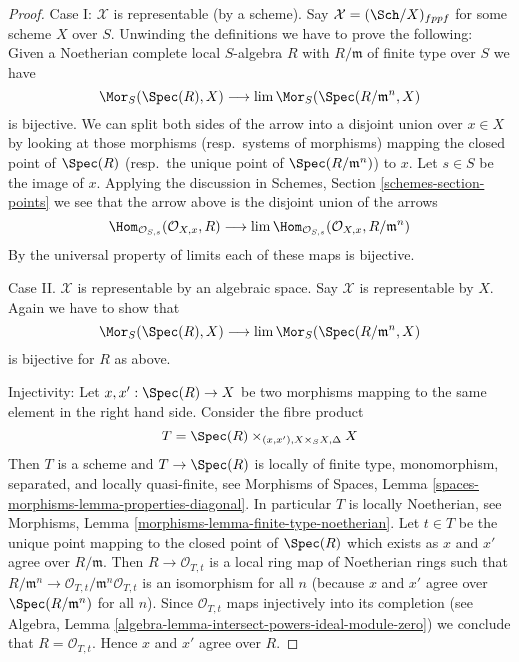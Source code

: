 \begin{proof}
Case I: $\mathcal{X}$ is representable (by a scheme). Say
$\mathcal{X} = (\Sch/X)_{fppf}$ for some scheme $X$ over $S$.
Unwinding the definitions we have to prove the following: Given
a Noetherian complete local $S$-algebra $R$ with $R/\mathfrak m$ of
finite type over $S$ we have
$$
\Mor_S(\Spec(R), X) \longrightarrow \lim \Mor_S(\Spec(R/\mathfrak m^n, X)
$$
is bijective. We can split both sides of the arrow into a disjoint union
over $x \in X$ by looking at those morphisms (resp.\ systems of morphisms)
mapping the closed point of $\Spec(R)$ (resp.\ the unique point of
$\Spec(R/\mathfrak m^n)$) to $x$. Let $s \in S$ be the image of $x$.
Applying the discussion in Schemes, Section \ref{schemes-section-points}
we see that the arrow above is the disjoint union of the arrows
$$
\Hom_{\mathcal{O}_{S, s}}(\mathcal{O}_{X, x}, R)
\longrightarrow
\lim \Hom_{\mathcal{O}_{S, s}}(\mathcal{O}_{X, x}, R/\mathfrak m^n)
$$
By the universal property of limits each of these maps is bijective.

\medskip\noindent
Case II. $\mathcal{X}$ is representable by an algebraic space. Say
$\mathcal{X}$ is representable by $X$. Again we have to show that
$$
\Mor_S(\Spec(R), X) \longrightarrow \lim \Mor_S(\Spec(R/\mathfrak m^n, X)
$$
is bijective for $R$ as above.

\medskip\noindent
Injectivity: Let $x, x' : \Spec(R) \to X$
be two morphisms mapping to the same element in the right hand side.
Consider the fibre product
$$
T = \Spec(R) \times_{(x, x'), X \times_S X, \Delta} X
$$
Then $T$ is a scheme and $T \to \Spec(R)$ is locally of finite type,
monomorphism, separated, and locally quasi-finite, see
Morphisms of Spaces, Lemma \ref{spaces-morphisms-lemma-properties-diagonal}.
In particular $T$ is locally Noetherian, see
Morphisms, Lemma \ref{morphisms-lemma-finite-type-noetherian}.
Let $t \in T$ be the unique point mapping to the closed point of $\Spec(R)$
which exists as $x$ and $x'$ agree over $R/\mathfrak m$. Then
$R \to \mathcal{O}_{T, t}$ is a local ring map of Noetherian rings such that
$R/\mathfrak m^n \to \mathcal{O}_{T, t}/\mathfrak m^n\mathcal{O}_{T, t}$
is an isomorphism for all $n$ (because $x$ and $x'$ agree over
$\Spec(R/\mathfrak m^n)$ for all $n$). Since $\mathcal{O}_{T, t}$
maps injectively into its completion (see
Algebra, Lemma \ref{algebra-lemma-intersect-powers-ideal-module-zero})
we conclude that $R = \mathcal{O}_{T, t}$. Hence $x$ and $x'$ agree
over $R$.


\end{proof}
